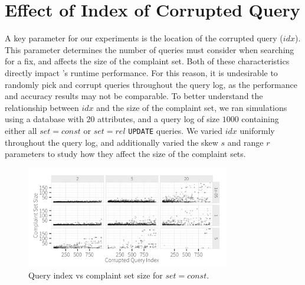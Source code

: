 
\appendix

\section{Effect of Index of Corrupted Query}
\label{app:qidx}

A key parameter for our experiments is the location of the corrupted query ($idx$).  
This parameter determines the number of queries \sys must consider when searching for a fix,
and affects the size of the complaint set.  
Both of these characteristics directly impact \sys's 
runtime performance. For this reason, it is undesirable to randomly pick and corrupt queries
throughout the query log, as the performance and accuracy results may not be comparable. 
To better understand the relationship between $idx$ and the size of the complaint set, we ran
simulations using a database with $20$ attributes, and a query log of size $1000$ containing
either all $set = const$ or $set = rel$ \texttt{UPDATE} queries.
We varied  $idx$ uniformly throughout the query log, and additionally varied
the skew $s$ and range $r$ parameters to study how they affect the size of the complaint sets.


  \begin{figure}[h]
  \centering
  \includegraphics[width = 3.5in]{figures/qidxsimulation/qidx_v_ncomplaints_20attrs_const}
  \caption{Query index vs complaint set size for $set = const$.}
  \label{f:qidx_v_ncomplaints_const} 
  \end{figure}


